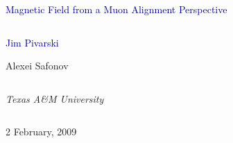 \documentclass[compress]{beamer}
\begin{document}
\begin{frame}
\vfill
\begin{center}
\textcolor{darkblue}{\Large Magnetic Field from a Muon Alignment Perspective}

\vfill
\begin{columns}
\begin{center}
\large
\textcolor{darkblue}{Jim Pivarski}

\vspace{0.2 cm}
Alexei Safonov
\end{center}
\end{columns}

\begin{columns}
\begin{center}
\scriptsize
{\it Texas A\&M University}
\end{center}
\end{columns}

\vfill
 2 February, 2009

\end{center}
\end{frame}


\small
\end{document}
